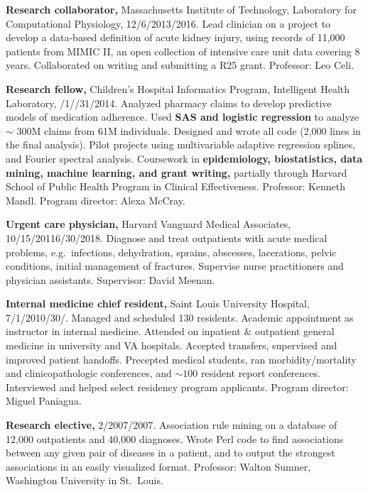 \documentclass[10pt]{article}
\begin{document}
\textbf{Research collaborator,} Massachusetts Institute of Technology,
Laboratory for Computational Physiology,
12/6/2013\ndash{}/2016. Lead clinician on a project to
develop a data-based definition of acute kidney injury, using records
of 11,000 patients from MIMIC II, an open collection of intensive care
unit data covering 8 years. Collaborated on writing and submitting a
R25 grant. Professor: Leo Celi.

\textbf{Research fellow,} Children's Hospital Informatics Program,
Intelligent Health Lab\-o\-ra\-to\-ry,
/1/\ndash{}/31/2014.
Analyzed pharmacy claims to develop predictive models of medication
adherence. Used \textbf{SAS and logistic
  regression} to analyze $\sim$ 300M claims from 61M individuals.
Designed and wrote all code (2,000 lines in
the final analysis). Pilot projects using multivariable adaptive
regression splines, and Fourier spectral analysis. Coursework in
\textbf{epidemiology, biostatistics, data mining, machine learning,
  and grant writing,} partially through Harvard School of Public
Health Program in Clinical Effectiveness. Professor: Kenneth Mandl.
Program director: Alexa McCray.

\textbf{Urgent care physician,} Harvard Vanguard Medical Associates,
10/15/2011\ndash{}6/30/2018. Diagnose and treat outpatients with acute
medical problems, e.g.\ infections, dehydration, sprains, abscesses,
lacerations, pelvic conditions, initial management of fractures.
Supervise nurse practitioners and physician assistants. Supervisor:
David Meenan.

\textbf{Internal medicine chief resident,} Saint Louis University
Hospital, 7/1/2010\ndash{}/30/. Managed
and scheduled 130 residents. Academic appointment as instructor in
internal medicine. Attended on inpatient \& outpatient general
medicine in university and VA hospitals. Accepted transfers,
supervised and improved patient handoffs. Precepted medical students,
ran morbidity/mortality and clinicopathologic conferences, and $\sim
100$ resident report conferences. Interviewed and helped select
residency program applicants. Program director: Miguel Paniagua.

\textbf{Research elective,} 2/2007/2007. Association rule
mining on a database of 12,000 outpatients and 40,000 diagnoses. Wrote
Perl code to find associations between any given pair of diseases in a
patient, and to output the strongest associations in an easily
visualized format. Professor: Walton Sumner, Washington University in
St.\ Louis.
\end{document}
